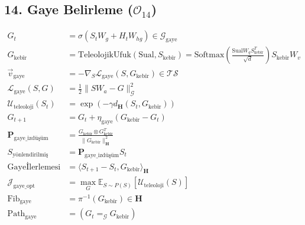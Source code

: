 \documentclass[11pt, a4paper]{article}
\begin{document}
\subsection{14. Gaye Belirleme ($\mathcal{O}_{14}$)}
\begin{align}
G_t &= \sigma(S_t W_g + H_t W_{hg}) \in \mathcal{G}_{\text{gaye}} \\
G_{\text{kebîr}} &= \text{TeleolojikUfuk}(\text{Sual}, S_{\text{kebîr}}) = \text{Softmax}\left( \frac{\text{Sual} W_q S_{\text{kebîr}}^T}{\sqrt{d}} \right) S_{\text{kebîr}} W_v \\
\vec{v}_{\text{gaye}} &= -\nabla_{S} \mathcal{L}_{\text{gaye}}(S, G_{\text{kebîr}}) \in \mathcal{T}\mathcal{S} \\
\mathcal{L}_{\text{gaye}}(S, G) &= \frac{1}{2} \|S W_a - G\|_{\mathcal{G}}^2 \\
\mathcal{U}_{\text{teleoloji}}(S_t) &= \exp\left( -\gamma d_{\mathbf{H}}(S_t, G_{\text{kebîr}}) \right) \\
G_{t+1} &= G_t + \eta_{\text{gaye}} (G_{\text{kebîr}} - G_t) \\
\mathbf{P}_{\text{gaye\_izdüşüm}} &= \frac{G_{\text{kebîr}} \otimes G_{\text{kebîr}}^T}{\|G_{\text{kebîr}}\|_{\mathbf{H}}^2} \\
S_{\text{yönlendirilmiş}} &= \mathbf{P}_{\text{gaye\_izdüşüm}} S_t \\
\text{Gayeİlerlemesi} &= \langle S_{t+1} - S_t, G_{\text{kebîr}} \rangle_{\mathbf{H}} \\
\mathcal{J}_{\text{gaye\_opt}} &= \max_{G} \mathbb{E}_{S \sim P(S)} [\mathcal{U}_{\text{teleoloji}}(S)] \\
\text{Fib}_{\text{gaye}} &= \pi^{-1}(G_{\text{kebîr}}) \in \mathbf{H} \\
\text{Path}_{\text{gaye}} &= (G_t =_{\mathcal{G}} G_{\text{kebîr}})
\end{align}
\end{document}
